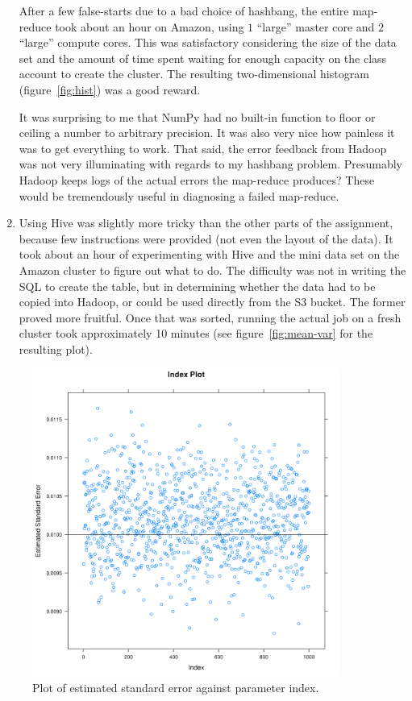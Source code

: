 \begin{enumerate}
After a few false-starts due to a bad choice of hashbang,
the entire map-reduce took about an hour on Amazon, using $1$ ``large'' master
core and $2$ ``large'' compute cores.
This was satisfactory considering the size of the data set and the amount of
time spent waiting for enough capacity on the class account to create the 
cluster.
The resulting two-dimensional histogram (figure~\ref{fig:hist}) was a good
reward.

It was surprising to me that NumPy had no built-in function to floor or ceiling
a number to arbitrary precision.
It was also very nice how painless it was to get everything to work.
That said, the error feedback from Hadoop was not very illuminating with
regards to my hashbang problem. 
Presumably Hadoop keeps logs of the actual errors the map-reduce produces?
These would be tremendously useful in diagnosing a failed map-reduce.

\item
Using Hive was slightly more tricky than the other parts of the assignment,
because few instructions were provided (not even the layout of the data).
It took about an hour of experimenting with Hive and the mini data set on the
Amazon cluster to figure out what to do.
The difficulty was not in writing the SQL to create the table, but in
determining whether the data had to be copied into Hadoop, or could be used
directly from the S3 bucket.
The former proved more fruitful.
Once that was sorted, running the actual job on a fresh cluster took
approximately 10 minutes (see figure~\ref{fig:mean-var} for the resulting plot).

\end{enumerate}
    \begin{figure}[p]
    \includegraphics[width = 0.9\textwidth]{res/01_index_plot.png}
    \caption{Plot of estimated standard error against parameter index.}
    \label{fig:index}
    \end{figure}


